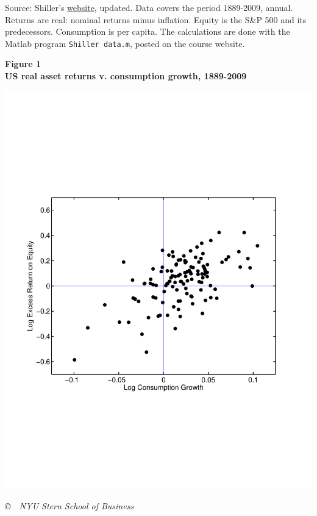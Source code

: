 \documentclass[11pt]{article}
\begin{document}
Source:  Shiller's 
\href{http://www.econ.yale.edu/~shiller/data.htm}{website}, updated.
Data covers the period 1889-2009, annual.
Returns are real:  nominal returns minus inflation.
Equity is the S\&P 500 and its predecessors.
Consumption is per capita.
The calculations are done with the Matlab program
{\tt Shiller data.m},
posted on the course website.

\pagebreak
{\large\bf Figure 1 \\ US real asset returns v. consumption growth, 1889-2009}

\includegraphics[width=\textwidth]{../Code/Matlab/scatter_gxr.pdf}

\vfill \centerline{\it \copyright \ \number\year \
NYU Stern School of Business}
\end{document}
